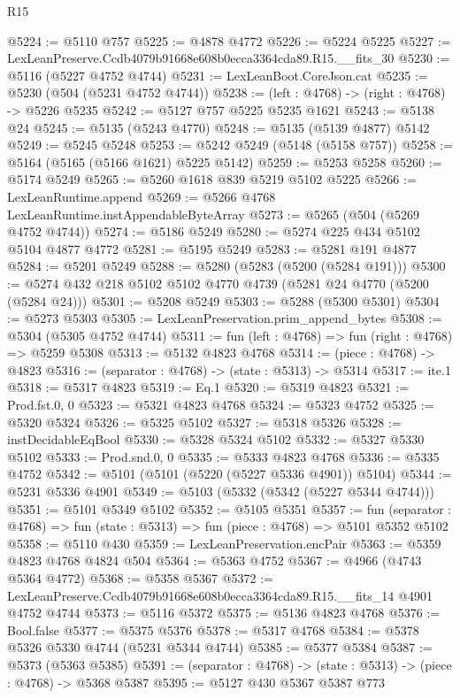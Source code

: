 \begin{lexlean}{R15}
\begin{coremodule}
{{{{{{{{{{{@5224 := @5110 @757
@5225 := @4878 @4772
@5226 := @5224 @5225
@5227 := LexLeanPreserve.Ccdb4079b91668e608b0ecca3364cda89.R15.__fits_30
@5230 := @5116 (@5227 @4752 @4744)
@5231 := LexLeanBoot.CoreJson.cat
@5235 := @5230 (@504 (@5231 @4752 @4744))
@5238 := (left : @4768) -> (right : @4768) -> @5226 @5235
@5242 := @5127 @757 @5225 @5235 @1621
@5243 := @5138 @24
@5245 := @5135 (@5243 @4770)
@5248 := @5135 (@5139 @4877) @5142
@5249 := @5245 @5248
@5253 := @5242 @5249 (@5148 (@5158 @757))
@5258 := @5164 (@5165 (@5166 @1621) @5225 @5142)
@5259 := @5253 @5258
@5260 := @5174 @5249
@5265 := @5260 @1618 @839 @5219 @5102 @5225
@5266 := LexLeanRuntime.append
@5269 := @5266 @4768 LexLeanRuntime.instAppendableByteArray
@5273 := @5265 (@504 (@5269 @4752 @4744))
@5274 := @5186 @5249
@5280 := @5274 @225 @434 @5102 @5104 @4877 @4772
@5281 := @5195 @5249
@5283 := @5281 @191 @4877
@5284 := @5201 @5249
@5288 := @5280 (@5283 (@5200 (@5284 @191)))
@5300 := @5274 @432 @218 @5102 @5102 @4770 @4739 (@5281 @24 @4770 (@5200 (@5284 @24)))
@5301 := @5208 @5249
@5303 := @5288 (@5300 @5301)
@5304 := @5273 @5303
@5305 := LexLeanPreservation.prim_append_bytes
@5308 := @5304 (@5305 @4752 @4744)
@5311 := fun (left : @4768) => fun (right : @4768) => @5259 @5308
@5313 := @5132 @4823 @4768
@5314 := (piece : @4768) -> @4823
@5316 := (separator : @4768) -> (state : @5313) -> @5314
@5317 := ite.{1}
@5318 := @5317 @4823
@5319 := Eq.{1}
@5320 := @5319 @4823
@5321 := Prod.fst.{0, 0}
@5323 := @5321 @4823 @4768
@5324 := @5323 @4752
@5325 := @5320 @5324
@5326 := @5325 @5102
@5327 := @5318 @5326
@5328 := instDecidableEqBool
@5330 := @5328 @5324 @5102
@5332 := @5327 @5330 @5102
@5333 := Prod.snd.{0, 0}
@5335 := @5333 @4823 @4768
@5336 := @5335 @4752
@5342 := @5101 (@5101 (@5220 (@5227 @5336 @4901)) @5104)
@5344 := @5231 @5336 @4901
@5349 := @5103 (@5332 (@5342 (@5227 @5344 @4744)))
@5351 := @5101 @5349 @5102
@5352 := @5105 @5351
@5357 := fun (separator : @4768) => fun (state : @5313) => fun (piece : @4768) => @5101 @5352 @5102
@5358 := @5110 @430
@5359 := LexLeanPreservation.encPair
@5363 := @5359 @4823 @4768 @4824 @504
@5364 := @5363 @4752
@5367 := @4966 (@4743 @5364 @4772)
@5368 := @5358 @5367
@5372 := LexLeanPreserve.Ccdb4079b91668e608b0ecca3364cda89.R15.__fits_14 @4901 @4752 @4744
@5373 := @5116 @5372
@5375 := @5136 @4823 @4768
@5376 := Bool.false
@5377 := @5375 @5376
@5378 := @5317 @4768
@5384 := @5378 @5326 @5330 @4744 (@5231 @5344 @4744)
@5385 := @5377 @5384
@5387 := @5373 (@5363 @5385)
@5391 := (separator : @4768) -> (state : @5313) -> (piece : @4768) -> @5368 @5387
@5395 := @5127 @430 @5367 @5387 @773
}}}}}}}}}}}
\end{coremodule}
\end{lexlean}
